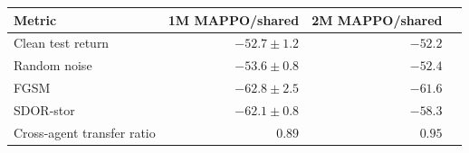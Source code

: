 \begin{tabular}{lrr l}
    \toprule
    Metric & 1M MAPPO/shared & 2M MAPPO/shared \\
    \midrule
    Clean test return            & $-52.7 \pm 1.2$ & $-52.2$ \\
    Random noise                 & $-53.6 \pm 0.8$ & $-52.4$ \\
    FGSM                         & $-62.8 \pm 2.5$ & $-61.6$ \\
    SDOR-stor                    & $-62.1 \pm 0.8$ & $-58.3$ \\
    Cross-agent transfer ratio   & $0.89$          & $0.95$  \\
    \bottomrule
    \end{tabular}
    